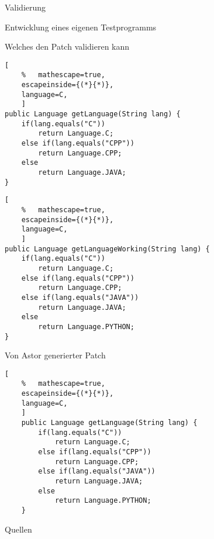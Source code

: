 %
\begin{frame}{Validierung}
\begin{itemizes}{1em}
	\item Entwicklung eines eigenen Testprogramms
	\item Welches den Patch validieren kann
\end{itemizes}
\end{frame}
%
\begin{frame}[fragile=singleslide]{}
\begin{minipage}{27em}
	\begin{lstlisting}[
	%	mathescape=true,
	escapeinside={(*}{*)}, 
	language=C,
	]
public Language getLanguage(String lang) {
	if(lang.equals("C"))
		return Language.C;
	else if(lang.equals("CPP"))
		return Language.CPP;
	else
		return Language.JAVA;
}
	\end{lstlisting}
\end{minipage}
\begin{minipage}{27em}
	\begin{lstlisting}[
	%	mathescape=true,
	escapeinside={(*}{*)}, 
	language=C,
	]
public Language getLanguageWorking(String lang) {
	if(lang.equals("C"))
		return Language.C;
	else if(lang.equals("CPP"))
		return Language.CPP;
	else if(lang.equals("JAVA"))
		return Language.JAVA;
	else
		return Language.PYTHON;
}
	\end{lstlisting}
\end{minipage}
\end{frame}
%
\begin{frame}[fragile=singleslide]{Von Astor generierter Patch}
	\begin{lstlisting}[
	%	mathescape=true,
	escapeinside={(*}{*)}, 
	language=C,
	]
	public Language getLanguage(String lang) {
		if(lang.equals("C"))
			return Language.C;
		else if(lang.equals("CPP"))
			return Language.CPP;
		else if(lang.equals("JAVA"))
			return Language.JAVA;
		else
			return Language.PYTHON;
	}
	\end{lstlisting}
\end{frame}
%
\begin{frame}{Quellen}
	
	\nocite{*}
	
\end{frame}
%